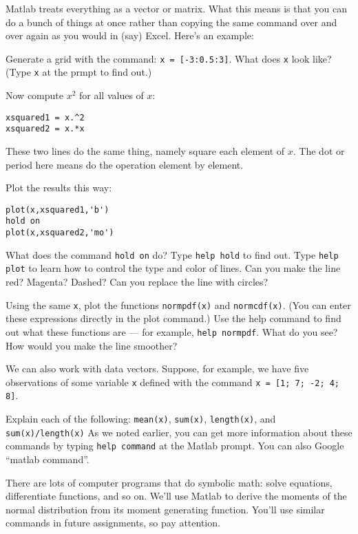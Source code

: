 \documentclass[11pt]{exam}
\begin{document}
\begin{questions}
Matlab treats everything as a vector or matrix.
What this means is that you can do a bunch of things at once rather than copying the same command
over and over again as you would in (say) Excel.  Here's an example:
\begin{parts}
\item  Generate a grid with the command:  {\tt x = [-3:0.5:3]}.
What does {\tt x} look like?
(Type {\tt x} at the prmpt to find out.)
\item  Now compute $x^2$ for all values of $x$:
\begin{verbatim}
xsquared1 = x.^2
xsquared2 = x.*x
\end{verbatim}
These two lines do the same thing, namely square each element of $x$.
The dot or period here means do the operation element by element.
\item  Plot the results this way:
\begin{verbatim}
plot(x,xsquared1,'b')
hold on
plot(x,xsquared2,'mo')
\end{verbatim}
What does the command {\tt hold on} do?
Type {\tt help hold} to find out.
Type {\tt help plot} to learn how to control the type and color of lines.
Can you make the line red?  Magenta?  Dashed?
Can you replace the line with circles?
\item  Using the same {\tt x},
plot the functions {\tt normpdf(x)} and {\tt normcdf(x)}.
(You can enter these expressions directly in the plot command.)
Use the help command to find out what these functions are ---
for example, {\tt help normpdf}.
What do you see?  How would you make the line smoother?
\end{parts}

We can also work with data vectors.
Suppose, for example, we have five observations
of some variable {\tt x} defined with the command
{\tt x = [1; 7; -2; 4; 8]}.

Explain each of the following:
{\tt mean(x)},
{\tt sum(x)},
{\tt length(x)}, and
{\tt sum(x)/length(x)}
%
As we noted earlier, you can get more information about these commands by
typing {\tt help command} at the Matlab prompt.
You can also Google ``matlab command''.

There are lots of computer programs that do symbolic math:
solve equations, differentiate functions, and so on.
We'll use Matlab to derive the moments
of the normal distribution from its moment generating function.
You'll use similar commands in future assignments, so pay attention.


\end{questions}
\end{document}
